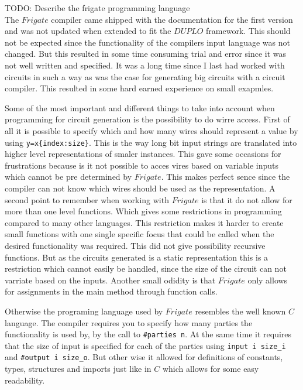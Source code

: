 \documentclass[twoside,11pt,openright]{report}
\newcommand{\todo}[1]{}
\renewcommand{\todo}[1]{{\color{red} TODO: {#1}} \\}
\begin{document}
\todo{Describe the frigate programming language}
The $Frigate$ compiler came shipped with the documentation for the first version and was not updated when extended to fit the $DUPLO$ framework. This should not be expected since the functionality of the compilers input language was not changed. But this resulted in some time consuming trial and error since it was not well written and specified. It was a long time since I last had worked with circuits in such a way as was the case for generating big circuits with a circuit compiler. This resulted in some hard earned experience on small exapmles.

Some of the most important and different things to take into account when programming for circuit generation is the possibility to do wirre access. First of all it is possible to specify which and how many wires should represent a value by using \verb|y=x{index:size}|. This is the way long bit input strings are translated into higher level representations of smaler instances. This gave some occasions for frustrations because is it not possible to acces vires based on variable inputs which cannot be pre determined by $Frigate$. This makes perfect sence since the compiler can not know which wires should be used as the representation.
A second point to remember when working with $Frigate$ is that it do not allow for more than one level functions. Which gives some restrictions in programming compared to many other languages. This restriction makes it harder to create small functions with one single specific focus that could be called when the desired functionality was required. This did not give possibility recursive functions. But as the circuits generated is a static representation this is a restriction which cannot easily be handled, since the size of the circuit can not varriate based on the inputs. Another small odidity is that $Frigate$ only allows for assignments in the main method through function calls.

Otherwise the programing language used by $Frigate$ resembles the well known $C$ language. The compiler requires you to specify how many parties the functionality is used by, by the call to \verb|#parties n|. At the same time it requires that the size of input is specified for each of the parties using \verb|input i size_i| and \verb|#output i size_o|. But other wise it allowed for definitions of constants, types, structures and imports just like in $C$ which allows for some easy readability.

\bigskip
\end{document}
